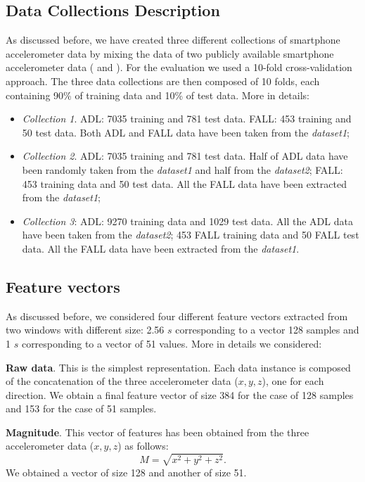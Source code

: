 \documentclass[twocolumn]{svjour3}          \smartqed  \usepackage[draft]{hyperref}
\begin{document}
\subsection{Data Collections Description}
As discussed before, we have created three different collections of smartphone accelerometer data by mixing the data of two publicly available smartphone accelerometer data (\citet{medrano2014} and \citet{anguita2013public}). For the evaluation we used a 10-fold cross-validation approach. The three data collections are then composed of 10 folds, each containing 90\% of training data and 10\% of test data. More in details:
\begin{itemize}
\item \emph{Collection 1}. ADL: 7035 training and 781 test data. FALL: 453 training and 50 test data.  Both ADL and FALL data have been taken from the \emph{dataset1};
\item \emph{Collection 2}. ADL: 7035 training and 781 test data. Half of ADL data have been randomly taken from the \emph{dataset1} and half from  the \emph{dataset2};  FALL: 453 training data and 50 test data.  All the FALL data have been extracted from the  \emph{dataset1};
\item \emph{Collection 3}: ADL: 9270 training data and 1029 test data. All the ADL data have been taken from the \emph{dataset2}; 453 FALL training data and 50 FALL test data.  All the FALL data have been extracted from the  \emph{dataset1}.
\end{itemize}

\subsection{Feature vectors}

As discussed before, we considered four different feature vectors extracted from two windows with different size: 2.56 $s$ corresponding to a vector 128 samples and 1 $s$ corresponding to a vector of 51 values. More in details we considered:

\noindent \textbf{Raw data}. This is the simplest representation. Each data instance is composed of the concatenation of the three accelerometer data ($x,y,z$), one for each direction. We obtain a final feature vector of size 384 for the case of 128 samples and 153 for the case of 51 samples.

\noindent \textbf{Magnitude}. This vector of features has been obtained from the three accelerometer data ($x,y,z$) as follows: $$M=\sqrt{x^2+y^2+z^2}.$$ We obtained a vector of size 128 and another of size 51.
\end{document}
